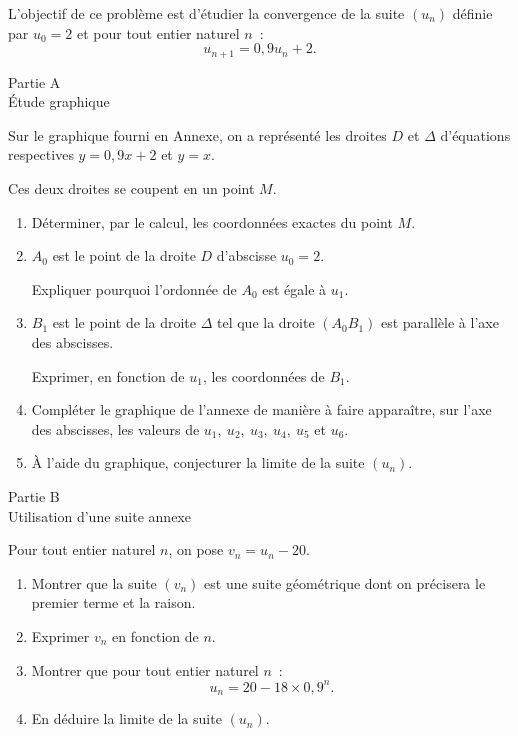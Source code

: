 
%
L'objectif de ce problème est d'étudier la convergence de la suite $(u_n)$ définie par $u_0=2$ et pour tout entier naturel $n$~:
\[ u_{n+1} = 0,9u_n+2.\]
%
\begin{center}\begin{h3}Partie A\\ \'Etude graphique \end{h3}\end{center}
Sur le graphique fourni en Annexe, on a représenté les droites $D$ et $\Delta$ d'équations respectives $y=0,9x+2$ et $y=x$.
\par
Ces deux droites se coupent en un point $M$.
\begin{enumerate}
     \item
     Déterminer, par le calcul, les coordonnées exactes du point $M$.
     \item
     $A_0$ est le point de la droite $D$ d'abscisse $u_0=2$.
     \par
     Expliquer pourquoi l'ordonnée de $A_0$ est égale à $u_1$.
     \item
     $B_1$ est le point de la droite $\Delta$ tel que la droite $(A_0B_1)$ est parallèle à l'axe des abscisses.
     \par
     Exprimer, en fonction de $u_1$, les coordonnées de $B_1$.
     \item
     Compléter le graphique de l'annexe de manière à faire apparaître, sur l'axe des abscisses, les valeurs de $u_1,\ u_2,\ u_3,\ u_4,\ u_5$ et $u_6$.
     \item
     \`A l'aide du graphique, conjecturer la limite de la suite $(u_n)$.
\end{enumerate}
%
\begin{center}\begin{h3}Partie B\\ Utilisation d'une suite annexe \end{h3}\end{center}
Pour tout entier naturel $n$, on pose $v_n=u_n-20$.
\begin{enumerate}
     \item
     Montrer que la suite $(v_n)$ est une suite géométrique dont on précisera le premier terme et la raison.
     \item
     Exprimer $v_n$ en fonction de $n$.
     \item
     Montrer que pour tout entier naturel $n$~:
     \[ u_n=20-18 \times 0,9^n. \]
     \item
     En déduire la limite de la suite $(u_n)$.
\end{enumerate}
